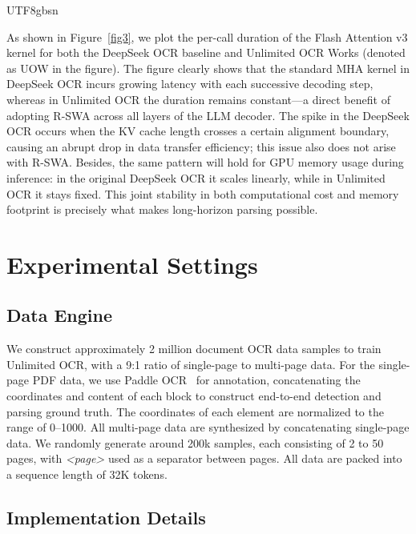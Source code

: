 \documentclass[11pt, a4paper, logo, copyright, nonumbering]{deepseek}
\begin{document}
\begin{CJK*}{UTF8}{gbsn}

As shown in Figure~\ref{fig3}, we plot the per-call duration of the Flash Attention v3 kernel for both the DeepSeek OCR baseline and Unlimited OCR Works (denoted as UOW in the figure). The figure clearly shows that the standard MHA kernel in DeepSeek OCR incurs growing latency with each successive decoding step, whereas in Unlimited OCR the duration remains constant—a direct benefit of adopting R-SWA across all layers of the LLM decoder. The spike in the DeepSeek OCR occurs when the KV cache length crosses a certain alignment boundary, causing an abrupt drop in data transfer efficiency; this issue also does not arise with R-SWA. Besides, the same pattern will hold for GPU memory usage during inference: in the original DeepSeek OCR it scales linearly, while in Unlimited OCR it stays fixed. This joint stability in both computational cost and memory footprint is precisely what makes long-horizon parsing possible.




\section{Experimental Settings}

\subsection{Data Engine}
\label{data}

We construct approximately 2 million document OCR data samples to train Unlimited OCR, with a 9:1 ratio of single-page to multi-page data. For the single-page PDF data, we use Paddle OCR~\cite{cui2025paddleocr} for annotation, concatenating the coordinates and content of each block to construct end-to-end detection and parsing ground truth. The coordinates of each element are normalized to the range of 0–1000. All multi-page data are synthesized by concatenating single-page data. We randomly generate around 200k samples, each consisting of 2 to 50 pages, with \textit{<page>} used as a separator between pages.  All data are packed into a sequence length of 32K tokens.





\subsection{Implementation Details}


\end{CJK*}
\end{document}
